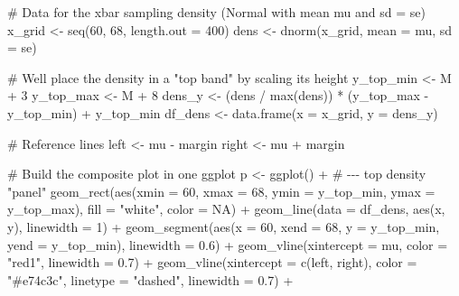 \documentclass[
  letterpaper,
  DIV=11,
  numbers=noendperiod]{scrreprt}
\newenvironment{Shaded}{\begin{snugshade}}{\end{snugshade}}
\newcommand{\AttributeTok}[1]{\textcolor[rgb]{0.40,0.45,0.13}{#1}}
\newcommand{\CommentTok}[1]{\textcolor[rgb]{0.37,0.37,0.37}{#1}}
\newcommand{\ConstantTok}[1]{\textcolor[rgb]{0.56,0.35,0.01}{#1}}
\newcommand{\DecValTok}[1]{\textcolor[rgb]{0.68,0.00,0.00}{#1}}
\newcommand{\FloatTok}[1]{\textcolor[rgb]{0.68,0.00,0.00}{#1}}
\newcommand{\FunctionTok}[1]{\textcolor[rgb]{0.28,0.35,0.67}{#1}}
\newcommand{\NormalTok}[1]{\textcolor[rgb]{0.00,0.23,0.31}{#1}}
\newcommand{\OtherTok}[1]{\textcolor[rgb]{0.00,0.23,0.31}{#1}}
\newcommand{\SpecialCharTok}[1]{\textcolor[rgb]{0.37,0.37,0.37}{#1}}
\newcommand{\StringTok}[1]{\textcolor[rgb]{0.13,0.47,0.30}{#1}}
\begin{document}
\begin{Shaded}
\begin{Highlighting}[]
\CommentTok{\# Data for the xbar sampling density (Normal with mean mu and sd = se)}
\NormalTok{x\_grid }\OtherTok{\textless{}{-}} \FunctionTok{seq}\NormalTok{(}\DecValTok{60}\NormalTok{, }\DecValTok{68}\NormalTok{, }\AttributeTok{length.out =} \DecValTok{400}\NormalTok{)}
\NormalTok{dens   }\OtherTok{\textless{}{-}} \FunctionTok{dnorm}\NormalTok{(x\_grid, }\AttributeTok{mean =}\NormalTok{ mu, }\AttributeTok{sd =}\NormalTok{ se)}

\CommentTok{\# We\textquotesingle{}ll place the density in a "top band" by scaling its height}
\NormalTok{y\_top\_min }\OtherTok{\textless{}{-}}\NormalTok{ M }\SpecialCharTok{+} \DecValTok{3}
\NormalTok{y\_top\_max }\OtherTok{\textless{}{-}}\NormalTok{ M }\SpecialCharTok{+} \DecValTok{8}
\NormalTok{dens\_y }\OtherTok{\textless{}{-}}\NormalTok{ (dens }\SpecialCharTok{/} \FunctionTok{max}\NormalTok{(dens)) }\SpecialCharTok{*}\NormalTok{ (y\_top\_max }\SpecialCharTok{{-}}\NormalTok{ y\_top\_min) }\SpecialCharTok{+}\NormalTok{ y\_top\_min}
\NormalTok{df\_dens }\OtherTok{\textless{}{-}} \FunctionTok{data.frame}\NormalTok{(}\AttributeTok{x =}\NormalTok{ x\_grid, }\AttributeTok{y =}\NormalTok{ dens\_y)}

\CommentTok{\# Reference lines}
\NormalTok{left  }\OtherTok{\textless{}{-}}\NormalTok{ mu }\SpecialCharTok{{-}}\NormalTok{ margin}
\NormalTok{right }\OtherTok{\textless{}{-}}\NormalTok{ mu }\SpecialCharTok{+}\NormalTok{ margin}

\CommentTok{\# Build the composite plot in one ggplot}
\NormalTok{p }\OtherTok{\textless{}{-}} \FunctionTok{ggplot}\NormalTok{() }\SpecialCharTok{+}
  \CommentTok{\# {-}{-}{-} top density "panel"}
  \FunctionTok{geom\_rect}\NormalTok{(}\FunctionTok{aes}\NormalTok{(}\AttributeTok{xmin =} \DecValTok{60}\NormalTok{, }\AttributeTok{xmax =} \DecValTok{68}\NormalTok{, }\AttributeTok{ymin =}\NormalTok{ y\_top\_min, }\AttributeTok{ymax =}\NormalTok{ y\_top\_max),}
            \AttributeTok{fill =} \StringTok{"white"}\NormalTok{, }\AttributeTok{color =} \ConstantTok{NA}\NormalTok{) }\SpecialCharTok{+}
  \FunctionTok{geom\_line}\NormalTok{(}\AttributeTok{data =}\NormalTok{ df\_dens, }\FunctionTok{aes}\NormalTok{(x, y), }\AttributeTok{linewidth =} \DecValTok{1}\NormalTok{) }\SpecialCharTok{+}
  \FunctionTok{geom\_segment}\NormalTok{(}\FunctionTok{aes}\NormalTok{(}\AttributeTok{x =} \DecValTok{60}\NormalTok{, }\AttributeTok{xend =} \DecValTok{68}\NormalTok{, }\AttributeTok{y =}\NormalTok{ y\_top\_min, }\AttributeTok{yend =}\NormalTok{ y\_top\_min), }\AttributeTok{linewidth =} \FloatTok{0.6}\NormalTok{) }\SpecialCharTok{+}
  \FunctionTok{geom\_vline}\NormalTok{(}\AttributeTok{xintercept =}\NormalTok{ mu, }\AttributeTok{color =} \StringTok{"red1"}\NormalTok{, }\AttributeTok{linewidth =} \FloatTok{0.7}\NormalTok{) }\SpecialCharTok{+}
  \FunctionTok{geom\_vline}\NormalTok{(}\AttributeTok{xintercept =} \FunctionTok{c}\NormalTok{(left, right), }\AttributeTok{color =} \StringTok{"\#e74c3c"}\NormalTok{, }\AttributeTok{linetype =} \StringTok{"dashed"}\NormalTok{, }\AttributeTok{linewidth =} \FloatTok{0.7}\NormalTok{) }\SpecialCharTok{+}


\end{Highlighting}
\end{Shaded}
\end{document}
